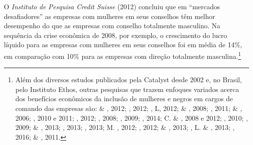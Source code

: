 O \emph{Instituto de Pesquisa Credit Suisse} (2012) concluiu que em
``mercados desafiadores'' as empresas com mulheres em seus conselhos têm
melhor desempenho do que as empresas com conselho totalmente masculino.
Na sequência da crise econômica de 2008, por exemplo, o crescimento do
lucro líquido para as empresas com mulheres em seus conselhos foi em
média de 14\%, em comparação com 10\% para as empresas com direção
totalmente masculina.\footnote{Além dos diversos estudos publicados pela
  Catalyst desde 2002 e, no Brasil, pelo Instituto Ethos, outras
  pesquisas que trazem enfoques variados acerca dos benefícios
  econômicos da inclusão de mulheres e negros em cargos de comando das
  empresas são:  \& , 2012; , 2012; , L, 2012;
   \& , 2008; , 2011;  \& , 2006; ,
  2010 e 2011; , 2012; , 2008; , 2009;
  , 2014;  C. \& , 2008 e 2012; , 2010; ,
  2009;  \& , 2013; , 2013; , 2013; M. ,
  2012; , 2012;  \& , 2013; , L. \& ,
  2013; , 2016;  \& , 2011.}

